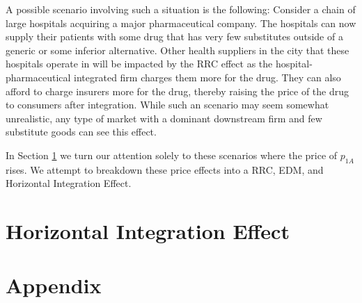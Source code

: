 \documentclass[12pt]{article}%
\begin{document}
A possible scenario involving such a situation is the following: Consider a chain of large hospitals acquiring a major pharmaceutical company. The hospitals can now supply their patients with some drug that has very few substitutes outside of a generic or some inferior alternative. Other health suppliers in the city that these hospitals operate in will be impacted by the RRC effect as the hospital-pharmaceutical integrated firm charges them more for the drug. They can also afford to charge insurers more for the drug, thereby raising the price of the drug to consumers after integration. While such an scenario may seem somewhat unrealistic, any type of market with a dominant downstream firm and few substitute goods can see this effect.


In Section \ref{horizontal effect} we turn our attention solely to these scenarios where the price of $p_{1A}$ rises. We attempt to breakdown these price effects into a RRC, EDM, and Horizontal Integration Effect.






\section{Horizontal Integration Effect} \label{horizontal effect}













\singlespacing
\normalsize





\newpage




\newpage
\section{Appendix}
\label{Appendix}
\end{document}
